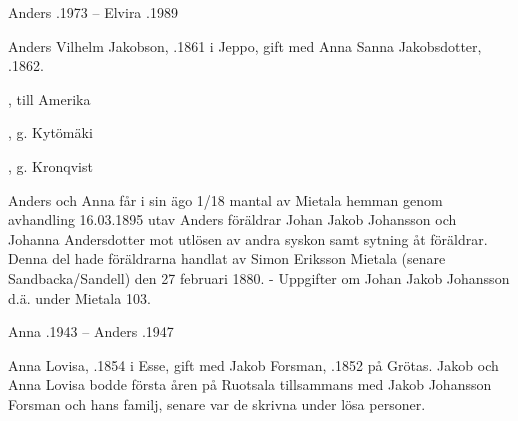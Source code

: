 Anders .1973  --  Elvira .1989


Anders Vilhelm Jakobson, .1861 i Jeppo, gift med Anna Sanna Jakobsdotter, .1862.
\begin{jhchildren}
  \item {}, till Amerika
  \item {}
  \item {}
  \item {}
  \item {}
  \item {}
  \item {}
  \item {}, g. Kytömäki
  \item {}, g. Kronqvist
\end{jhchildren}

Anders och Anna får i sin ägo 1/18 mantal av Mietala hemman genom avhandling 16.03.1895 utav Anders föräldrar Johan Jakob Johansson och Johanna Andersdotter mot utlösen av andra syskon samt sytning åt föräldrar. Denna del hade föräldrarna handlat av Simon Eriksson Mietala (senare Sandbacka/Sandell) den 27 februari 1880. - Uppgifter om Johan Jakob Johansson d.ä. under Mietala 103.

Anna .1943  --  Anders .1947




Anna Lovisa, .1854 i Esse, gift med Jakob Forsman, .1852 på Grötas. Jakob och Anna Lovisa bodde första åren på Ruotsala tillsammans med Jakob Johansson Forsman och hans familj, senare var de skrivna under lösa personer.
\begin{jhchildren}
  \item {}
  \item {}
  \item {}
\end{jhchildren}

